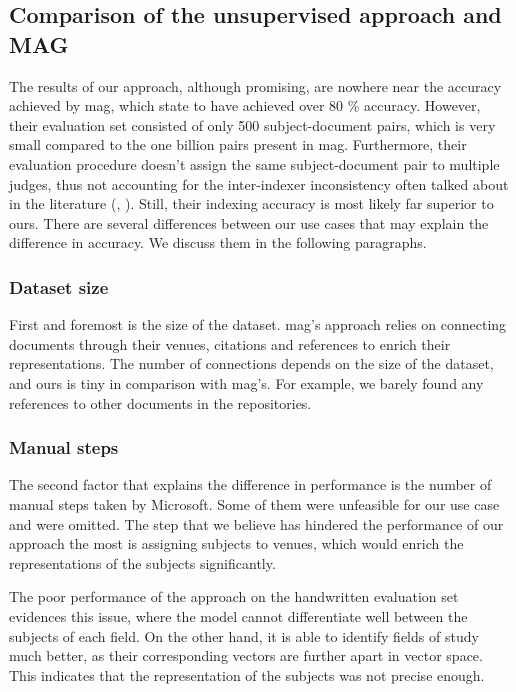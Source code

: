 \subsection{Comparison of the unsupervised approach and MAG}

The results of our approach, although promising, are nowhere near the accuracy achieved by \acrshort{mag}, which state to have achieved over 80 \% accuracy. However, their evaluation set consisted of only 500 subject-document pairs, which is very small compared to the one billion pairs present in \acrshort{mag}. Furthermore, their evaluation procedure doesn't assign the same subject-document pair to multiple judges, thus not accounting for the inter-indexer inconsistency often talked about in the literature (\cite{medelyan2008domain}, \cite{csomai2007investigations}). Still, their indexing accuracy is most likely far superior to ours. There are several differences between our use cases that may explain the difference in accuracy. We discuss them in the following paragraphs.

\subsubsection{Dataset size}

First and foremost is the size of the dataset. \acrshort{mag}'s approach relies on connecting documents through their venues, citations and references to enrich their representations. The number of connections depends on the size of the dataset, and ours is tiny in comparison with \acrshort{mag}'s. For example, we barely found any references to other documents in the repositories.

\subsubsection{Manual steps}

The second factor that explains the difference in performance is the number of manual steps taken by Microsoft. Some of them were unfeasible for our use case and were omitted. The step that we believe has hindered the performance of our approach the most is assigning subjects to venues, which would enrich the representations of the subjects significantly.

The poor performance of the approach on the handwritten evaluation set evidences this issue, where the model cannot differentiate well between the subjects of each field. On the other hand, it is able to identify fields of study much better, as their corresponding vectors are further apart in vector space. This indicates that the representation of the subjects was not precise enough.

